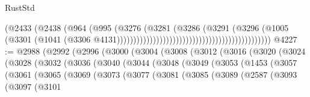 \begin{lexlean}{RustStd}
\begin{coremodule}
                                                                        (@2433
                                                                          (@2438
                                                                            (@964
                                                                              (@995
                                                                                (@3276
                                                                                  (@3281
                                                                                    (@3286
                                                                                      (@3291
                                                                                        (@3296
                                                                                          (@1005
                                                                                            (@3301
                                                                                              (@1041
                                                                                                (@3306
                                                                                                  @4131)))))))))))))))))))))))))))))))))))))))))))))))
@4227 := @2988
    (@2992
      (@2996
        (@3000
          (@3004
            (@3008
              (@3012
                (@3016
                  (@3020
                    (@3024
                      (@3028
                        (@3032
                          (@3036
                            (@3040
                              (@3044
                                (@3048
                                  (@3049
                                    (@3053
                                      (@1453
                                        (@3057
                                          (@3061
                                            (@3065
                                              (@3069
                                                (@3073
                                                  (@3077
                                                    (@3081
                                                      (@3085
                                                        (@3089
                                                          (@2587
                                                            (@3093
                                                              (@3097
                                                                (@3101

\end{coremodule}
\end{lexlean}
